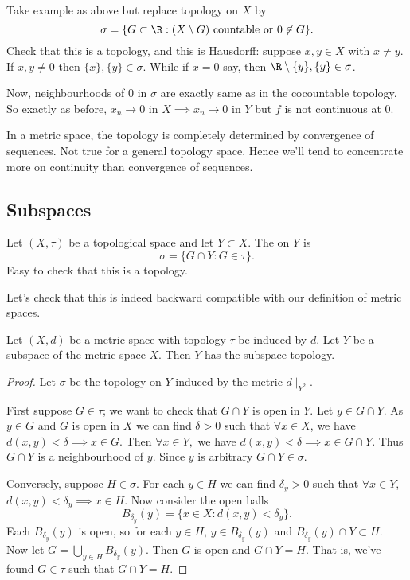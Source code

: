 \begin{example}
Take example as above but replace topology on $X$ by \[\sigma = \{G\subset \R : (X \setminus G) \textup{ countable or } 0\not\in G \}. \]
Check that this is a topology, and this is Hausdorff: suppose $x,y\in X$ with $x\neq y$. If $x,y\neq 0$ then $\{x\}, \{y\}\in \sigma$. While if $x=0$ say, then $\R \setminus \{y\}, \{y\}\in \sigma$.

Now, neighbourhoods of $0$ in $\sigma$ are exactly same as in the cocountable topology. So exactly as before, $x_n \to 0$ in $X\implies x_n \to 0$ in $Y$ but $f$ is not continuous at $0$.
\end{example}
\begin{remark}
In a metric space, the topology is completely determined by convergence of sequences. Not true for a general topology space. Hence we'll tend to concentrate more on continuity than convergence of sequences.
\end{remark}

\subsection{Subspaces}
\begin{definition}
Let $(X,\tau)$ be a topological space and let $Y\subset X$. The  on $Y$ is \[ \sigma = \{G\cap Y : G\in \tau \}.\] Easy to check that this is a topology.
\end{definition}

Let's check that this is indeed backward compatible with our definition of metric spaces.

\begin{proposition} \label{prp:31}
Let $(X,d)$ be a metric space with topology $\tau$ be induced by $d$. Let $Y$ be a subspace of the metric space $X$. Then $Y$ has the subspace topology.
\end{proposition}  
\begin{proof}
Let $\sigma$ be the topology on $Y$ induced by the metric $d\mid_{Y^2}$. 

First suppose $G\in \tau$; we want to check that $G\cap Y$ is open in $Y$. Let $y\in G\cap Y$. As $y\in G$ and $G$ is open in $X$ we can find $\delta >0$ such that $\forall x\in X$, we have $d(x,y)<\delta \implies x\in G$. Then $\forall x\in Y,$ we have $d(x,y)<\delta \implies x \in G\cap Y$. Thus $G\cap Y$ is a neighbourhood of $y$. Since $y$ is arbitrary $G\cap Y\in \sigma$.

Conversely, suppose $H\in \sigma$. For each $y\in H$ we can find $\delta_y>0$ such that $\forall x\in Y$, $d(x,y)<\delta_y\implies x\in H$. Now consider the open balls\[B_{\delta_y}(y) = \{x\in X : d(x,y) < \delta_y\}. \] Each $B_{\delta_y}(y)$ is open, so for each $y\in H$, $y\in B_{\delta_y}(y)$ and $B_{\delta_y}(y)\cap Y\subset H$. Now let $G = \bigcup_{y\in H}B_{\delta_y}(y)$. Then $G$ is open and $G\cap Y= H$. That is, we've found $G\in \tau$ such that $G\cap Y = H$.
\end{proof}

